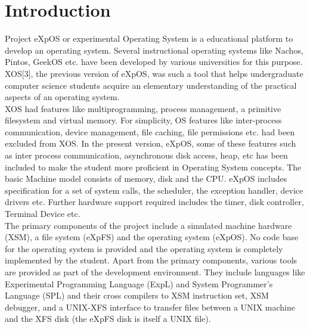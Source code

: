 \chapter{Introduction}
\label{chap2}

Project eXpOS or experimental Operating System is a educational platform to develop an operating system. Several instructional operating systems like Nachos, Pintos, GeekOS etc. have been developed by various universities for this purpose.
XOS[3], the previous version of eXpOS, was such a tool that helps undergraduate computer science students acquire an elementary understanding of the practical aspects of an operating system.
\\

XOS had features like multiprogramming, process management, a primitive filesystem and virtual memory. For simplicity, OS features like inter-process communication, device management, file caching, file permissions etc. had been excluded from XOS. In the present version, eXpOS, some of these features such as inter process communication, asynchronous disk access, heap, etc has been included to make the student more proficient in Operating System concepts. The basic Machine model consists of memory, disk and the CPU. eXpOS includes specification for a set of system calls, the scheduler, the exception handler, device drivers etc.  Further hardware support required includes the timer, disk controller, Terminal Device etc.
\\

The primary components of the project include a simulated machine hardware (XSM), a file system (eXpFS) and the operating system (eXpOS). No code base for the operating system is provided and the operating system is completely implemented by the student. Apart from the primary components, various tools are provided as part of the development environment. They include languages like Experimental Programming Language (ExpL) and System Programmer's Language (SPL) and their cross compilers to XSM instruction set, XSM debugger, and a UNIX-XFS interface to transfer files between a UNIX machine and the XFS disk (the eXpFS disk is itself a UNIX file). 

